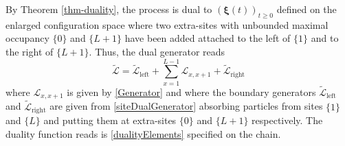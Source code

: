 \documentclass[10pt]{article}
\numberwithin{equation}{section}
\numberwithin{equation}{subsection}
\begin{document}
By Theorem \ref{thm-duality}, the process is dual to $(\bm{\xi}(t))_{t\geq0} $ defined on the enlarged configuration space where two extra-sites with unbounded maximal occupancy $\{0\}$ and $\{L+1\}$ have been added attached to the left of $\{1\}$ and to the right of $\{L+1\}$.
Thus, the dual generator reads
\begin{equation}
	\widetilde{\mathcal{L}}=\widetilde{\mathcal{L}}_{\text{left}}+\sum_{x=1}^{L-1}\mathcal{L}_{x,x+1}+\widetilde{\mathcal{L}}_{\text{right}}
\end{equation} 
where $\mathcal{L}_{x,x+1}$ is given by \eqref{Generator} and where the boundary generators $\widetilde{\mathcal{L}}_{\text{left}}$ and $\widetilde{\mathcal{L}}_{\text{right}}$ are given from \eqref{siteDualGenerator} absorbing particles from sites $\{1\}$ and $\{L\}$ and putting them at extra-sites $\{0\}$ and $\{L+1\}$ respectively. The duality function reads is \eqref{dualityElements} specified on the chain. 
\begin{comment}
\begin{equation}\label{abs-dual-boundary-chain}
	\begin{split}
		\widetilde{\mathcal{L}}_{\text{left}}f(\bm{\xi})&=|\alpha|\sum_{a=1}^{N-1}\xi_{a}^{1}\left(f(\bm{\xi}-\bm{\delta}_{a}^{1}+\bm{\delta}_{N}^{1}+\bm{\delta}_{a}^{0})f(\bm{\xi})\right)\\\widetilde{\mathcal{L}}_{\text{right}}f(\bm{\xi})&=|\beta|\sum_{a=1}^{N-1}\xi_{a}^{L}\left(f(\bm{\xi}-\bm{\delta}_{a}^{L}+\bm{\delta}_{N}^{L}+\bm{\delta}_{a}^{L+1})-f(\bm{\xi})\right)
	\end{split}
\end{equation}
where $0$ and $L+1$ are the extra-sites.
\end{comment} 
\begin{comment}
, i.e.
\begin{equation}\label{dualityFunctionChain}
	D(\bm{n},\bm{\xi})=\prod_{a=1}^{N-1}\left(\rho_{a}^{L}\right)^{\xi_{a}^{0}}\prod_{x=1}^{L}\frac{(\nu-\sum_{a=1}^{N-1}\xi_{a}^{x})!}{\nu!}\prod_{a=1}^{N-1}\frac{\eta_{a}^{x}!}{(n_{a}^{x}-\xi_{a}^{x})!}\prod_{a=1}^{N-1}\left(\rho_{a}^{R}\right)^{\xi_{a}^{L+1}}
\end{equation}
where $\rho_{\alpha}^{L}=\frac{\alpha_{a}}{|\alpha|}$ and where $\rho_{\alpha}^{R}=\frac{\beta_{a}}{|\beta|}$.\\
\end{comment}
\end{document}
